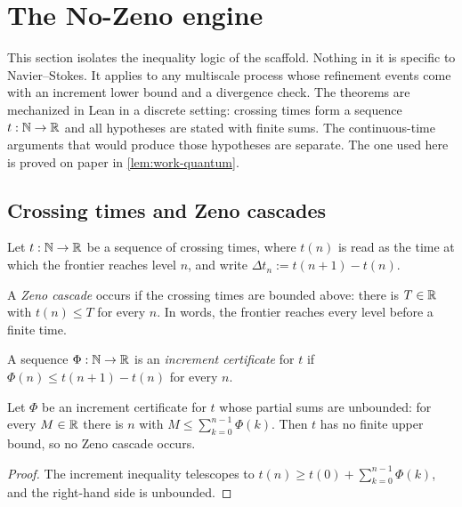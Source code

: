 \section{The No-Zeno engine}\label{sec:no-zeno-engine}

This section isolates the inequality logic of the scaffold. Nothing in it is specific to
Navier--Stokes. It applies to any multiscale process whose refinement events come with an
increment lower bound and a divergence check. The theorems are mechanized in Lean in a discrete
setting: crossing times form a sequence $t:\mathbb{N}\to\mathbb{R}$ and all hypotheses are stated with finite sums.
The continuous-time arguments that would produce those hypotheses are separate. The one used here
is proved on paper in \cref{lem:work-quantum}.

\subsection{Crossing times and Zeno cascades}

Let $t:\mathbb{N}\to\mathbb{R}$ be a sequence of crossing times, where $t(n)$ is read as the time at which the
frontier reaches level $n$, and write $\Delta t_n:=t(n+1)-t(n)$.

\begin{definition}\label{def:zeno}
A \emph{Zeno cascade} occurs if the crossing times are bounded above: there is $T\in\mathbb{R}$ with
$t(n)\le T$ for every $n$. In words, the frontier reaches every level before a finite time.
\end{definition}

\begin{definition}\label{def:phi}
A sequence $\Phi:\mathbb{N}\to\mathbb{R}$ is an \emph{increment certificate} for $t$ if
$\Phi(n)\le t(n+1)-t(n)$ for every $n$.
\end{definition}

\begin{theorem}\label{thm:unbounded-sums-no-zeno}
Let $\Phi$ be an increment certificate for $t$ whose partial sums are unbounded: for every
$M\in\mathbb{R}$ there is $n$ with $M\le\sum_{k=0}^{n-1}\Phi(k)$. Then $t$ has no finite upper bound, so
no Zeno cascade occurs.
\end{theorem}

\begin{proof}
The increment inequality telescopes to $t(n)\ge t(0)+\sum_{k=0}^{n-1}\Phi(k)$, and the right-hand
side is unbounded.
\end{proof}

